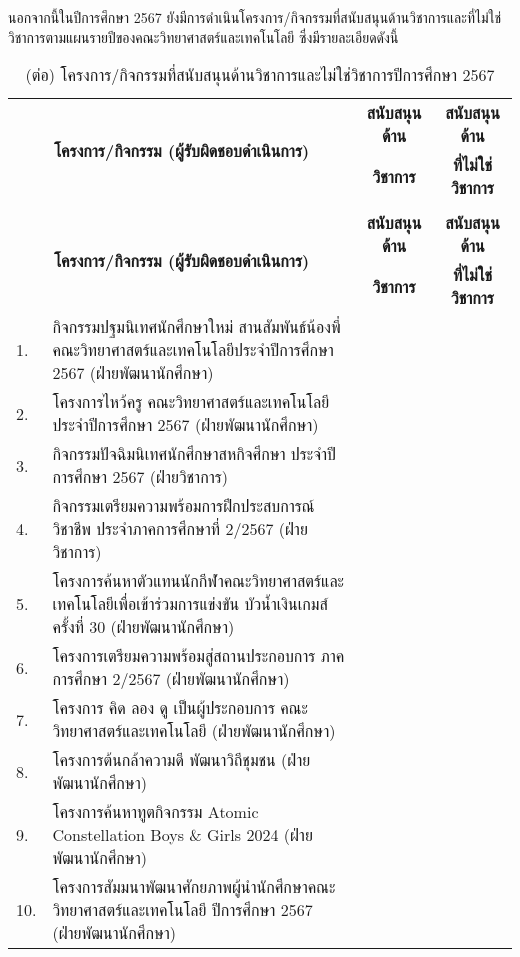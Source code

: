 นอกจากนี้ในปีการศึกษา 2567 ยังมีการดำเนินโครงการ/กิจกรรมที่สนับสนุนด้านวิชาการและที่ไม่ใช่วิชาการตามแผนรายปีของคณะวิทยาศาสตร์และเทคโนโลยี ซึ่งมีรายละเอียดดังนี้
\begin{longtable}{|p{0.2cm} >{\raggedright}p{9cm}|c|c|}
	\caption{โครงการ/กิจกรรมที่สนับสนุนด้านวิชาการและไม่ใช่วิชาการปีการศึกษา 2567}
	\label{table:PDF-2567}\\
	\hline
	\multicolumn{2}{|c|}{\multirow{2}{*}{\textbf{โครงการ/กิจกรรม (ผู้รับผิดชอบดำเนินการ)}}} &  \textbf{สนับสนุนด้าน} & \textbf{สนับสนุนด้าน} \\
	&&  \textbf{ วิชาการ} & \textbf{ที่ไม่ใช่วิชาการ} \\
	\hline
	\endfirsthead
		\caption{(ต่อ) โครงการ/กิจกรรมที่สนับสนุนด้านวิชาการและไม่ใช่วิชาการปีการศึกษา 2567}\\
	\hline
	\multicolumn{2}{|c|}{\multirow{2}{*}{\textbf{โครงการ/กิจกรรม (ผู้รับผิดชอบดำเนินการ)}}} &  \textbf{สนับสนุนด้าน} & \textbf{สนับสนุนด้าน} \\
	&&  \textbf{ วิชาการ} & \textbf{ที่ไม่ใช่วิชาการ} \\
	\hline
	\endhead
	1.&กิจกรรมปฐมนิเทศนักศึกษาใหม่ สานสัมพันธ์น้องพี่คณะวิทยาศาสตร์และเทคโนโลยีประจำปีการศึกษา 2567 (ฝ่ายพัฒนานักศึกษา) & & \checkmark \\ \hline
	2.&โครงการไหว้ครู คณะวิทยาศาสตร์และเทคโนโลยี ประจำปีการศึกษา 2567 (ฝ่ายพัฒนานักศึกษา) & & \checkmark \\\hline
	3.&กิจกรรมปัจฉิมนิเทศนักศึกษาสหกิจศึกษา ประจำปีการศึกษา 2567 (ฝ่ายวิชาการ) & \checkmark & \\ \hline
	4.&กิจกรรมเตรียมความพร้อมการฝึกประสบการณ์วิชาชีพ ประจำภาคการศึกษาที่ 2/2567 (ฝ่ายวิชาการ) & \checkmark & \\ \hline
	5.&โครงการค้นหาตัวแทนนักกีฬาคณะวิทยาศาสตร์และเทคโนโลยีเพื่อเข้าร่วมการแข่งขัน บัวน้ำเงินเกมส์ ครั้งที่ 30 (ฝ่ายพัฒนานักศึกษา) & & \checkmark \\ \hline
	6.&โครงการเตรียมความพร้อมสู่สถานประกอบการ ภาคการศึกษา 2/2567 (ฝ่ายพัฒนานักศึกษา)  & \checkmark &  \\ \hline
	7.&โครงการ คิด ลอง ดู เป็นผู้ประกอบการ คณะวิทยาศาสตร์และเทคโนโลยี (ฝ่ายพัฒนานักศึกษา) & \checkmark &   \\ \hline
	8.&โครงการต้นกล้าความดี พัฒนาวิถีชุมชน (ฝ่ายพัฒนานักศึกษา) & \checkmark &   \\ \hline
	9.&โครงการค้นหาทูตกิจกรรม Atomic Constellation Boys \& Girls 2024 (ฝ่ายพัฒนานักศึกษา) & & \checkmark \\ \hline
	10.&โครงการสัมมนาพัฒนาศักยภาพผู้นำนักศึกษาคณะวิทยาศาสตร์และเทคโนโลยี ปีการศึกษา 2567 (ฝ่ายพัฒนานักศึกษา) & & \checkmark \\
	\hline
\end{longtable}


